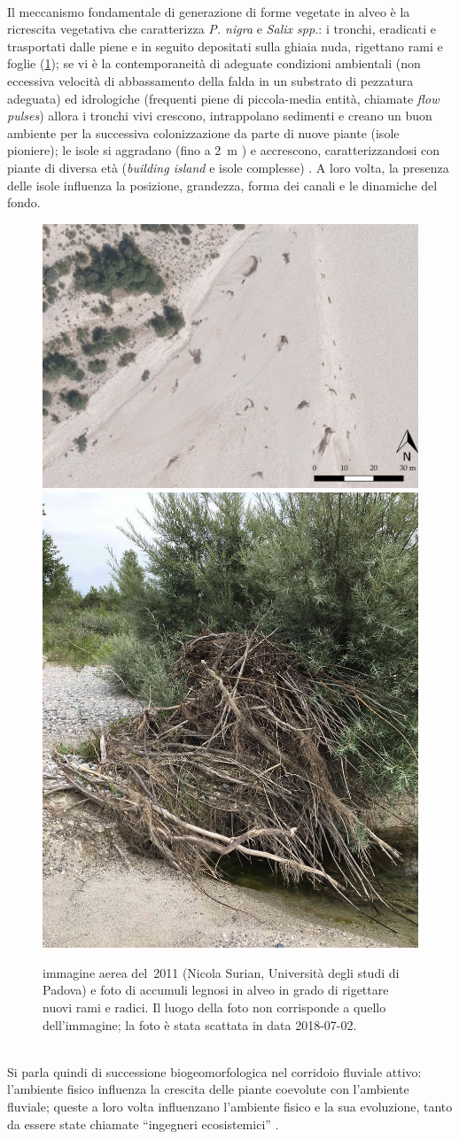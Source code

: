 %
\\
Il meccanismo fondamentale di generazione di forme vegetate in alveo è la ricrescita vegetativa che caratterizza \emph{P. nigra} e \emph{Salix spp.}: i tronchi, eradicati e trasportati dalle piene e in seguito depositati sulla ghiaia nuda, rigettano rami e foglie (\cref{fig:esempio-accumulo});
se vi è la contemporaneità di adeguate condizioni ambientali (non eccessiva velocità di abbassamento della falda in un substrato di pezzatura adeguata) ed idrologiche (frequenti piene di piccola-media entità, chiamate \emph{flow pulses}) allora i tronchi vivi crescono, intrappolano sedimenti e creano un buon ambiente per la successiva colonizzazione da parte di nuove piante (isole pioniere);
le isole si aggradano (fino a \SI{2}{\m} ) e accrescono, caratterizzandosi con piante di diversa età (\emph{building island} e isole complesse) .
A loro volta, la presenza delle isole influenza la posizione, grandezza, forma dei canali e le dinamiche del fondo.
%
\begin{figure}
	\centering
	\includegraphics[height = .43\textwidth]{files/esempio_accumulo_sat_1.jpeg}
	\;
	\includegraphics[height = .43\textwidth]{files/esempio_accumulo_1.jpg}
	\caption[immagine e foto di accumuli legnosi]{immagine aerea del~2011 (Nicola Surian, Università degli studi di Padova) e foto di accumuli legnosi in alveo in grado di rigettare nuovi rami e radici. Il luogo della foto non corrisponde a quello dell'immagine; la foto è stata scattata in data 2018-07-02.}
	\label{fig:esempio-accumulo}
\end{figure}
%
\\
Si parla quindi di successione biogeomorfologica nel corridoio fluviale attivo: l'ambiente fisico influenza la crescita delle piante coevolute con l'ambiente fluviale; queste a loro volta influenzano l'ambiente fisico e la sua evoluzione, tanto da essere state chiamate “ingegneri ecosistemici” .

